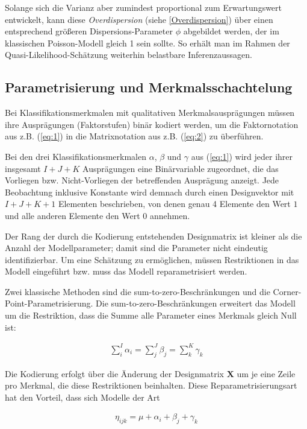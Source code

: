 Solange sich die Varianz aber zumindest proportional zum Erwartungswert entwickelt, kann diese \textit{Overdispersion} (siehe \ref{Overdispersion}) über einen entsprechend größeren Dispersions-Parameter $\phi$  abgebildet werden, der im klassischen Poisson-Modell gleich 1 sein sollte. So erhält man im Rahmen der Quasi-Likelihood-Schätzung weiterhin belastbare Inferenzaussagen.

\subsection{Parametrisierung und Merkmalsschachtelung}

Bei Klassifikationsmerkmalen mit qualitativen Merkmalsausprägungen müssen ihre Ausprägungen (Faktorstufen) binär kodiert werden, um die Faktornotation aus z.B. (\ref{eq:1}) in die Matrixnotation aus z.B. (\ref{eq:2}) zu überführen.

Bei den drei Klassifikationsmerkmalen $\alpha$, $\beta$ und $\gamma$  aus (\ref{eq:1}) wird jeder ihrer insgesamt $I+J+K$  Ausprägungen eine Binärvariable zugeordnet, die das Vorliegen bzw. Nicht-Vorliegen der betreffenden Ausprägung anzeigt. Jede Beobachtung inklusive Konstante wird demnach durch einen Designvektor mit $I+J+K+1$  Elementen beschrieben, von denen genau 4 Elemente den Wert $1$ und alle anderen Elemente den Wert $0$ annehmen.

Der Rang der durch die Kodierung entstehenden Designmatrix ist kleiner als die Anzahl der Modellparameter; damit sind die Parameter nicht eindeutig identifizierbar. Um eine Schätzung zu ermöglichen, müssen Restriktionen in das Modell eingeführt bzw. muss das Modell reparametrisiert werden.

Zwei klassische Methoden sind die sum-to-zero-Beschränkungen und die Corner-Point-Parametrisierung. Die sum-to-zero-Beschränkungen erweitert das Modell um die Restriktion, dass die Summe alle Parameter eines Merkmals gleich Null ist:


\begin{eqnarray}  
\sum_i^I \alpha_i = \sum_j^J \beta_j =\sum_k^K \gamma_k
\end{eqnarray}
 
Die Kodierung erfolgt über die Änderung der Designmatrix $\bm{X}$  um je eine Zeile pro Merkmal, die diese Restriktionen beinhalten. Diese Reparametrisierungsart hat den Vorteil, dass sich Modelle der Art


\begin{eqnarray}  
\eta_{ijk} = \mu + \alpha_i + \beta_j + \gamma_k
\end{eqnarray}

